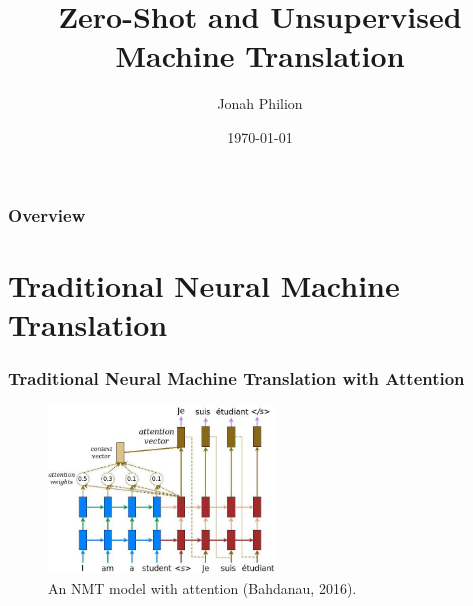 \documentclass{beamer}
\title[UNMT]{Zero-Shot and Unsupervised Machine Translation} %
\author{Jonah Philion} %
\institute[CS 287] %
{
\medskip
\textit{} %
}
\date{\today} %
\begin{document}
\begin{frame}
\titlepage %
\end{frame}

\begin{frame}
\frametitle{Overview} %
\tableofcontents %
\end{frame}


\section{Traditional Neural Machine Translation} %


\begin{frame}
\frametitle{Traditional Neural Machine Translation with Attention}
 \begin{figure}
  \centering
  \includegraphics[width=6cm]{pres_imgs/attention_mechanism}
  \caption{\label{fig:attention_mechanism} An NMT model with attention (Bahdanau, 2016). }
\end{figure}
\end{frame}
\end{document}
